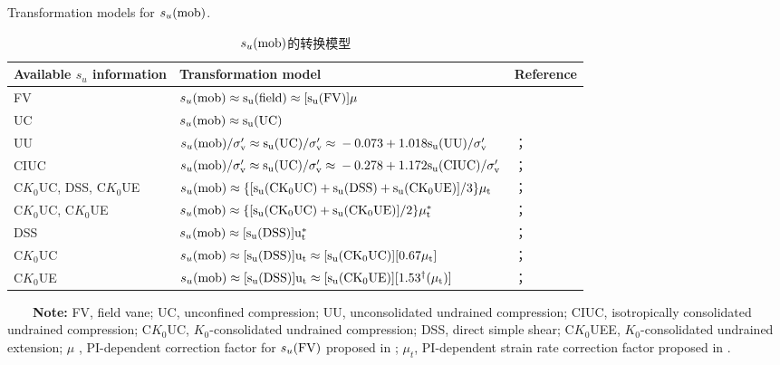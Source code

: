 \begin{table}[!htb]
    \centering
    \scriptsize
    \caption{Transformation models for $s_u(\rm{mob})$.}
    \addtocounter{table}{-1}
    \vspace{-8pt}
    \renewcommand{\tablename}{表}
    \caption{$s_u(\rm{mob})$的转换模型}
    \vspace{4pt}
    \renewcommand{\tablename}{Table}
    \begin{tabularx}{\textwidth}{lll}
        \toprule
        Available $s_u$ information & Transformation model & Reference\\
        \midrule
        FV & $s_u(\rm{mob})\approx{}s_u(\rm{field})\approx{}[s_u(\rm{FV})]\mu$ & \citet{Bjerrum19721} \\
        UC & $s_u(\rm{mob})\approx{}s_u(\rm{UC})$ & \citet{Mesri20071} \\
        UU & $s_u(\rm{mob})/\sigma_v'\approx{}s_u(\rm{UC})/\sigma_v'\approx{}-0.073+1.018s_u(\rm{UU})/\sigma_v'$ & \citet{Chen19931732}；\citet{Mesri20071} \\
        CIUC & $s_u(\rm{mob})/\sigma_v'\approx{}s_u(\rm{UC})/\sigma_v'\approx{}-0.278+1.172s_u(\rm{CIUC})/\sigma_v'$ & \citet{Chen19931732}；\citet{Mesri20071} \\
        C$K_0$UC, DSS, C$K_0$UE & $s_u(\rm{mob})\approx{}\{[s_u(\rm{C}K_0\rm{UC})+s_u(\rm{DSS})+s_u(\rm{C}K_0\rm{UE})]/3\}\mu_t$ & \citet{Mesri20071}；\citet{Kulhawy1990}\\
        C$K_0$UC, C$K_0$UE & $s_u(\rm{mob})\approx{}\{[s_u(\rm{C}K_0\rm{UC})+s_u(\rm{C}K_0\rm{UE})]/2\}\mu_t^*$ & \citet{Mesri20071}；\citet{Kulhawy1990}\\
        DSS & $s_u(\rm{mob})\approx{}[s_u(\rm{DSS})]u_t^*$ & \citet{Mesri20071}；\citet{Kulhawy1990}\\
        C$K_0$UC & $s_u(\rm{mob})\approx{}[s_u(\rm{DSS})]u_t\approx{}[s_u(\rm{C}K_0\rm{UC})][0.67\mu_t]$ & \citet{Mesri20071}；\citet{Kulhawy1990}\\
        C$K_0$UE & $s_u(\rm{mob})\approx{}[s_u(\rm{DSS})]u_t\approx{}[s_u(\rm{C}K_0\rm{UE})][1.53^\dag(\mu_t)]$ & \citet{Mesri20071}；\citet{Kulhawy1990}\\
        \bottomrule
    \end{tabularx}%
    {\raggedright\vspace{4pt}

    ~~~~\textbf{Note:} FV, field vane; UC, unconfined compression; UU, unconsolidated undrained compression; CIUC, isotropically consolidated undrained compression; C$K_0$UC, $K_0$-consolidated undrained compression; DSS, direct simple shear; C$K_0$UEE, $K_0$-consolidated undrained extension; $\mu$ , PI-dependent correction factor for $s_u(\rm{FV})$ proposed in \citet{Bjerrum19721}; $\mu_t$, PI-dependent strain rate correction factor proposed in \citet{Terzaghi1996}. 

}
\end{table}
